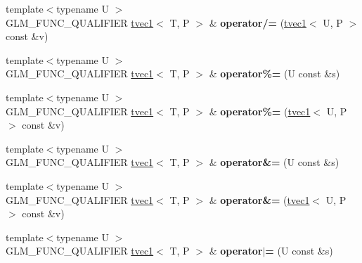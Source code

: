 \begin{DoxyCompactItemize}
\item 
\hypertarget{structglm_1_1tvec1_ad0331e0db142714cc1169da2d209eb01}{{\footnotesize template$<$typename U $>$ }\\G\-L\-M\-\_\-\-F\-U\-N\-C\-\_\-\-Q\-U\-A\-L\-I\-F\-I\-E\-R \hyperlink{structglm_1_1tvec1}{tvec1}$<$ T, P $>$ \& {\bfseries operator/=} (\hyperlink{structglm_1_1tvec1}{tvec1}$<$ U, P $>$ const \&v)}\label{structglm_1_1tvec1_ad0331e0db142714cc1169da2d209eb01}

\item 
\hypertarget{structglm_1_1tvec1_a1b1abbae5ae19821f9610b497014cb1a}{{\footnotesize template$<$typename U $>$ }\\G\-L\-M\-\_\-\-F\-U\-N\-C\-\_\-\-Q\-U\-A\-L\-I\-F\-I\-E\-R \hyperlink{structglm_1_1tvec1}{tvec1}$<$ T, P $>$ \& {\bfseries operator\%=} (U const \&s)}\label{structglm_1_1tvec1_a1b1abbae5ae19821f9610b497014cb1a}

\item 
\hypertarget{structglm_1_1tvec1_aa8eca5faec8c0bef17a99524d60bf89d}{{\footnotesize template$<$typename U $>$ }\\G\-L\-M\-\_\-\-F\-U\-N\-C\-\_\-\-Q\-U\-A\-L\-I\-F\-I\-E\-R \hyperlink{structglm_1_1tvec1}{tvec1}$<$ T, P $>$ \& {\bfseries operator\%=} (\hyperlink{structglm_1_1tvec1}{tvec1}$<$ U, P $>$ const \&v)}\label{structglm_1_1tvec1_aa8eca5faec8c0bef17a99524d60bf89d}

\item 
\hypertarget{structglm_1_1tvec1_a1a8daed99d9d8808625589a885de7b57}{{\footnotesize template$<$typename U $>$ }\\G\-L\-M\-\_\-\-F\-U\-N\-C\-\_\-\-Q\-U\-A\-L\-I\-F\-I\-E\-R \hyperlink{structglm_1_1tvec1}{tvec1}$<$ T, P $>$ \& {\bfseries operator\&=} (U const \&s)}\label{structglm_1_1tvec1_a1a8daed99d9d8808625589a885de7b57}

\item 
\hypertarget{structglm_1_1tvec1_abefaca20e1e35858d53e0d30763ed1a9}{{\footnotesize template$<$typename U $>$ }\\G\-L\-M\-\_\-\-F\-U\-N\-C\-\_\-\-Q\-U\-A\-L\-I\-F\-I\-E\-R \hyperlink{structglm_1_1tvec1}{tvec1}$<$ T, P $>$ \& {\bfseries operator\&=} (\hyperlink{structglm_1_1tvec1}{tvec1}$<$ U, P $>$ const \&v)}\label{structglm_1_1tvec1_abefaca20e1e35858d53e0d30763ed1a9}

\item 
\hypertarget{structglm_1_1tvec1_a5f51736d2a988e861b0014aa3f172860}{{\footnotesize template$<$typename U $>$ }\\G\-L\-M\-\_\-\-F\-U\-N\-C\-\_\-\-Q\-U\-A\-L\-I\-F\-I\-E\-R \hyperlink{structglm_1_1tvec1}{tvec1}$<$ T, P $>$ \& {\bfseries operator$\vert$=} (U const \&s)}\label{structglm_1_1tvec1_a5f51736d2a988e861b0014aa3f172860}


\end{DoxyCompactItemize}

